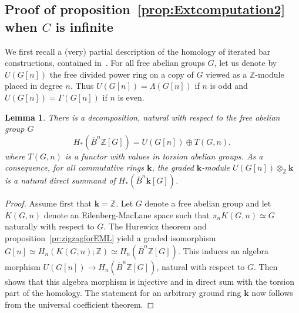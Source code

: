 \documentclass{amsart}
\newtheorem{lemma}[formula]{Lemma}
\theoremstyle{definition}
\theoremstyle{remark}
\newcommand{\Z}{\mathbb Z}
\def\k{\mathbf{k}}
\begin{document}
\subsection{Proof of proposition~\ref{prop:Extcomputation2} when $C$ is infinite}\label{subsec:proof1Z}
We first recall a (very) partial description of the homology of iterated bar constructions, contained in~\cite{ca-54}.
For all free abelian groups $G$, let us denote by $U(G[n])$ the free divided power ring on a copy of $G$ viewed as a $\Z$-module placed in degree $n$. Thus $U(G[n])=\Lambda(G[n])$ if $n$ is odd and $U(G[n])=\Gamma(G[n])$ if $n$ is even. 
\begin{lemma}\label{lm:clecar0}
	There is a decomposition, natural with respect to the free abelian group $G$
	\[
		H_*(\overline{B}^n\Z[G])=U(G[n])\oplus T(G,n),
	\]
	where $T(G,n)$ is a functor with values in torsion abelian groups. 
	As a consequence, for all commutative rings $\k$, the graded $\k$-module $U(G[n])\otimes_\Z\k$ is a natural direct summand of $H_*(\overline{B}^n\k[G])$.
\end{lemma}
\begin{proof}
	Assume first that $\k=\Z$. Let $G$ denote a free abelian group and
	let $K(G,n)$ denote an Eilenberg-MacLane space such that $\pi_nK(G,n)\simeq G$ naturally with respect to $G$. The Hurewicz theorem and proposition~\ref{pr:zigzagforEML} yield a graded isomorphism $G[n]\simeq H_n(K(G,n);\Z)\simeq H_n(\overline{B}^n\Z[G])$. This induces an algebra morphism $U(G[n])\to H_n(\overline{B}^n\Z[G])$, natural with respect to $G$. Then~\cite[Exp.~11,~Thm.~1]{ca-54} shows that this algebra morphism is injective and in direct sum with the torsion part of the homology. 
	The statement for an arbitrary ground ring $\k$ now follows from the universal coefficient theorem.
\end{proof}
	
\end{document}
